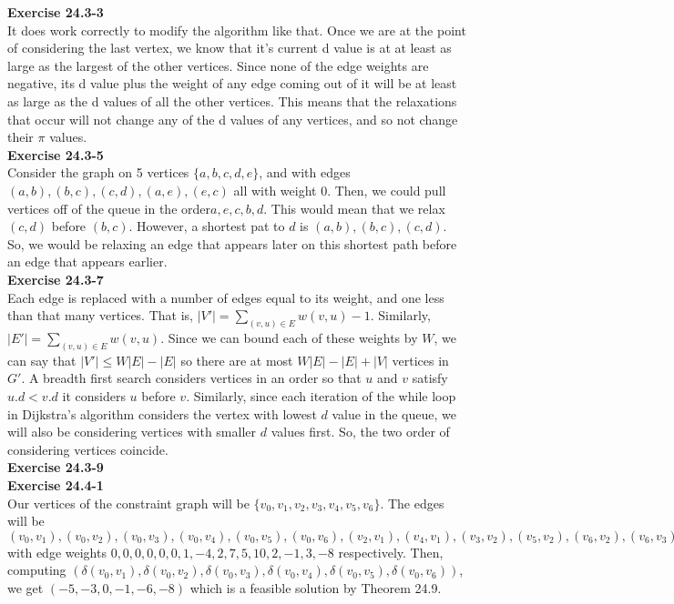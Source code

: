\documentclass{article}
\begin{document}
\noindent\textbf{Exercise 24.3-3}\\
It does work correctly to modify the algorithm like that. Once we are at the point of considering the last vertex, we know that it's current d value is at at least as large as the largest of the other vertices. Since none of the edge weights are negative, its d value plus the weight of any edge coming out of it will be at least as large as the d values of all the other vertices. This means that the relaxations that occur will not change any of the d values of any vertices, and so not change their $\pi$ values.\\

\noindent\textbf{Exercise 24.3-5}\\
Consider the graph on 5 vertices $\{a,b,c,d,e\}$, and with edges $(a,b),(b,c),(c,d),(a,e),(e,c)$ all with weight 0. Then, we could pull vertices off of the queue in the order$a,e,c,b,d$. This would mean that we relax $(c,d)$ before $(b,c)$. However, a shortest pat to $d$ is $(a,b),(b,c),(c,d)$. So, we would be relaxing an edge that appears later on this shortest path before an edge that appears earlier.\\

\noindent\textbf{Exercise 24.3-7}\\
Each edge is replaced with a number of edges equal to its weight, and one less than that many vertices. That is, $|V'| = \sum_{(v,u)\in E} w(v,u) -1$. Similarly, $|E'| = \sum_{(v,u)\in E} w(v,u)$. Since we can bound each of these weights by $W$, we can say that $|V'| \le W|E|-|E|$ so there are at most $W|E|-|E|+|V|$ vertices in $G'$. A breadth first search considers vertices in an order so that $u$ and $v$ satisfy $u.d < v.d$ it considers $u$ before $v$. Similarly, since each iteration of the while loop in Dijkstra's algorithm considers the vertex with lowest $d$ value in the queue, we will also be considering vertices with smaller $d$ values first. So, the two order of considering vertices coincide.\\

\noindent\textbf{Exercise 24.3-9}\\

\noindent\textbf{Exercise 24.4-1}\\
Our vertices of the constraint graph will be $\{v_0,v_1,v_2,v_3,v_4,v_5,v_6\}$. The edges will be $(v_0,v_1),(v_0,v_2),(v_0,v_3),(v_0,v_4),(v_0,v_5),(v_0,v_6),(v_2,v_1),(v_4,v_1),(v_3,v_2),(v_5,v_2),(v_6,v_2),(v_6,v_3),(v_2,v_4),(v_1,v_5),(v_4,v_5),(v_3,v_6)$ with edge weights $0,0,0,0,0,0,1,-4,2,7,5,10,2,-1,3,-8$ respectively. Then, computing $(\delta(v_0,v_1),\delta(v_0,v_2),\delta(v_0,v_3),\delta(v_0,v_4),\delta(v_0,v_5),\delta(v_0,v_6))$, we get $(-5,-3,0,-1,-6,-8)$ which is a feasible solution by Theorem 24.9.\\
\end{document}
